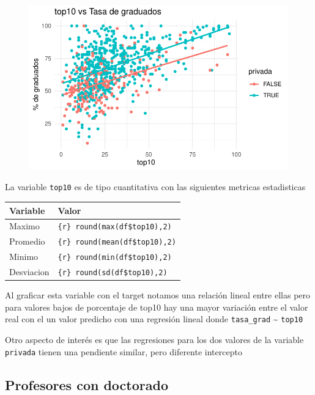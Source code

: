 \documentclass[
  letterpaper,
  DIV=11,
  numbers=noendperiod]{scrartcl}
\begin{document}
\begin{figure}[H]

{\centering \includegraphics{TP_final_files/figure-pdf/unnamed-chunk-16-1.pdf}

}

\end{figure}

La variable \texttt{top10} es de tipo cuantitativa con las siguientes
metricas estadisticas

\begin{longtable}[]{@{}ll@{}}
\toprule\noalign{}
Variable & Valor \\
\midrule\noalign{}
\endhead
\bottomrule\noalign{}
\endlastfoot
Maximo & \texttt{\{r\}\ round(max(df\$top10),2)} \\
Promedio & \texttt{\{r\}\ round(mean(df\$top10),2)} \\
Minimo & \texttt{\{r\}\ round(min(df\$top10),2)} \\
Desviacion & \texttt{\{r\}\ round(sd(df\$top10),2)} \\
\end{longtable}

Al graficar esta variable con el target notamos una relación lineal
entre ellas pero para valores bajos de porcentaje de top10 hay una mayor
variación entre el valor real con el un valor predicho con una regresión
lineal donde \texttt{tasa\_grad} \textasciitilde{} \texttt{top10}

Otro aspecto de interés es que las regresiones para los dos valores de
la variable \texttt{privada} tienen una pendiente similar, pero
diferente intercepto

\hypertarget{profesores-con-doctorado}{%
\subsection{Profesores con doctorado}\label{profesores-con-doctorado}}
\end{document}
